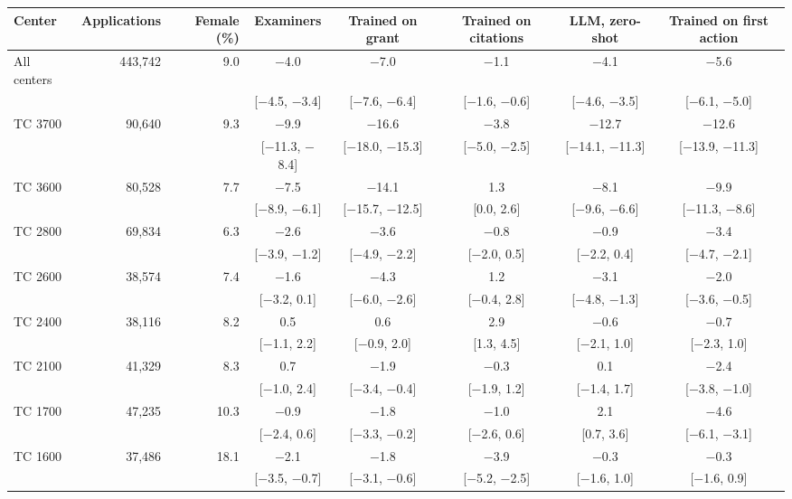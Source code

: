 \begin{tabular}{lrrccccc}
\toprule
Center & Applications & Female (\%) & Examiners & Trained on grant & Trained on citations & LLM, zero-shot & Trained on first action \\
\midrule
All centers & 443,742 & 9.0 & $-$4.0 & $-$7.0 & $-$1.1 & $-$4.1 & $-$5.6 \\
 &  &  & {\footnotesize [$-$4.5, $-$3.4]} & {\footnotesize [$-$7.6, $-$6.4]} & {\footnotesize [$-$1.6, $-$0.6]} & {\footnotesize [$-$4.6, $-$3.5]} & {\footnotesize [$-$6.1, $-$5.0]} \\
TC 3700 & 90,640 & 9.3 & $-$9.9 & $-$16.6 & $-$3.8 & $-$12.7 & $-$12.6 \\
 &  &  & {\footnotesize [$-$11.3, $-$8.4]} & {\footnotesize [$-$18.0, $-$15.3]} & {\footnotesize [$-$5.0, $-$2.5]} & {\footnotesize [$-$14.1, $-$11.3]} & {\footnotesize [$-$13.9, $-$11.3]} \\
TC 3600 & 80,528 & 7.7 & $-$7.5 & $-$14.1 & 1.3 & $-$8.1 & $-$9.9 \\
 &  &  & {\footnotesize [$-$8.9, $-$6.1]} & {\footnotesize [$-$15.7, $-$12.5]} & {\footnotesize [0.0, 2.6]} & {\footnotesize [$-$9.6, $-$6.6]} & {\footnotesize [$-$11.3, $-$8.6]} \\
TC 2800 & 69,834 & 6.3 & $-$2.6 & $-$3.6 & $-$0.8 & $-$0.9 & $-$3.4 \\
 &  &  & {\footnotesize [$-$3.9, $-$1.2]} & {\footnotesize [$-$4.9, $-$2.2]} & {\footnotesize [$-$2.0, 0.5]} & {\footnotesize [$-$2.2, 0.4]} & {\footnotesize [$-$4.7, $-$2.1]} \\
TC 2600 & 38,574 & 7.4 & $-$1.6 & $-$4.3 & 1.2 & $-$3.1 & $-$2.0 \\
 &  &  & {\footnotesize [$-$3.2, 0.1]} & {\footnotesize [$-$6.0, $-$2.6]} & {\footnotesize [$-$0.4, 2.8]} & {\footnotesize [$-$4.8, $-$1.3]} & {\footnotesize [$-$3.6, $-$0.5]} \\
TC 2400 & 38,116 & 8.2 & 0.5 & 0.6 & 2.9 & $-$0.6 & $-$0.7 \\
 &  &  & {\footnotesize [$-$1.1, 2.2]} & {\footnotesize [$-$0.9, 2.0]} & {\footnotesize [1.3, 4.5]} & {\footnotesize [$-$2.1, 1.0]} & {\footnotesize [$-$2.3, 1.0]} \\
TC 2100 & 41,329 & 8.3 & 0.7 & $-$1.9 & $-$0.3 & 0.1 & $-$2.4 \\
 &  &  & {\footnotesize [$-$1.0, 2.4]} & {\footnotesize [$-$3.4, $-$0.4]} & {\footnotesize [$-$1.9, 1.2]} & {\footnotesize [$-$1.4, 1.7]} & {\footnotesize [$-$3.8, $-$1.0]} \\
TC 1700 & 47,235 & 10.3 & $-$0.9 & $-$1.8 & $-$1.0 & 2.1 & $-$4.6 \\
 &  &  & {\footnotesize [$-$2.4, 0.6]} & {\footnotesize [$-$3.3, $-$0.2]} & {\footnotesize [$-$2.6, 0.6]} & {\footnotesize [0.7, 3.6]} & {\footnotesize [$-$6.1, $-$3.1]} \\
TC 1600 & 37,486 & 18.1 & $-$2.1 & $-$1.8 & $-$3.9 & $-$0.3 & $-$0.3 \\
 &  &  & {\footnotesize [$-$3.5, $-$0.7]} & {\footnotesize [$-$3.1, $-$0.6]} & {\footnotesize [$-$5.2, $-$2.5]} & {\footnotesize [$-$1.6, 1.0]} & {\footnotesize [$-$1.6, 0.9]} \\
\bottomrule
\end{tabular}
